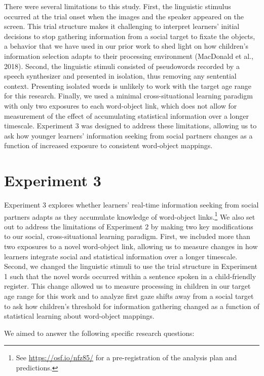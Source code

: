 \documentclass[man,floatsintext]{apa6}
\let\rmarkdownfootnote\footnote%
\def\footnote{\protect\rmarkdownfootnote}
\begin{document}
There were several limitations to this study. First, the linguistic
stimulus occurred at the trial onset when the images and the speaker
appeared on the screen. This trial structure makes it challenging to
interpret learners' initial decisions to stop gathering information from
a social target to fixate the objects, a behavior that we have used in
our prior work to shed light on how children's information selection
adapts to their processing environment (MacDonald et al., 2018). Second,
the linguistic stimuli consisted of pseudowords recorded by a speech
synthesizer and presented in isolation, thus removing any sentential
context. Presenting isolated words is unlikely to work with the target
age range for this research. Finally, we used a minimal
cross-situational learning paradigm with only two exposures to each
word-object link, which does not allow for measurement of the effect of
accumulating statistical information over a longer timescale. Experiment
3 was designed to address these limitations, allowing us to ask how
younger learners' information seeking from social partners changes as a
function of increased exposure to consistent word-object mappings.

\section{Experiment 3}\label{experiment-3}

Experiment 3 explores whether learners' real-time information seeking
from social partners adapts as they accumulate knowledge of word-object
links.\footnote{See \url{https://osf.io/nfz85/} for a pre-registration
  of the analysis plan and predictions.} We also set out to address the
limitations of Experiment 2 by making two key modifications to our
social, cross-situational learning paradigm. First, we included more
than two exposures to a novel word-object link, allowing us to measure
changes in how learners integrate social and statistical information
over a longer timescale. Second, we changed the linguistic stimuli to
use the trial structure in Experiment 1 such that the novel words
occurred within a sentence spoken in a child-friendly register. This
change allowed us to measure processing in children in our target age
range for this work and to analyze first gaze shifts away from a social
target to ask how children's threshold for information gathering changed
as a function of statistical learning about word-object mappings.

We aimed to answer the following specific research questions:
\end{document}
